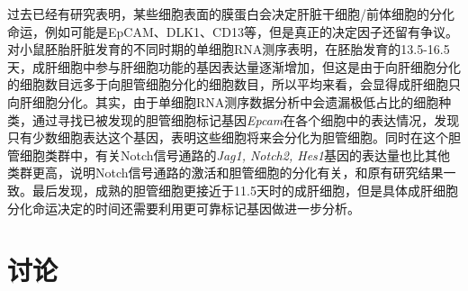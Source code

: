 \documentclass[lang=cn]{elegantpaper}
\begin{document}
过去已经有研究表明，某些细胞表面的膜蛋白会决定肝脏干细胞/前体细胞的分化命运，例如可能是EpCAM、DLK1、CD13\citep{okabe_potential_2009,tanimizu_isolation_2003,kakinuma_analyses_2009}等，但是真正的决定因子还留有争议。对小鼠胚胎肝脏发育的不同时期的单细胞RNA测序表明\citep{su_single-cell_2017}，在胚胎发育的13.5-16.5天，成肝细胞中参与肝细胞功能的基因表达量逐渐增加，但这是由于向肝细胞分化的细胞数目远多于向胆管细胞分化的细胞数目，所以平均来看，会显得成肝细胞只向肝细胞分化。其实，由于单细胞RNA测序数据分析中会遗漏极低占比的细胞种类，\cite{su_single-cell_2017}通过寻找已被发现的胆管细胞标记基因\emph{Epcam}\citep{miyajima_stem/progenitor_2014}在各个细胞中的表达情况，发现只有少数细胞表达这个基因，表明这些细胞将来会分化为胆管细胞。同时在这个胆管细胞类群中，有关Notch信号通路的\emph{Jag1, Notch2, Hes1}基因的表达量也比其他类群更高，说明Notch信号通路的激活和胆管细胞的分化有关，和原有研究结果一致\citep{zong_notch_2009}。最后\cite{su_single-cell_2017}发现，成熟的胆管细胞更接近于11.5天时的成肝细胞，但是具体成肝细胞分化命运决定的时间还需要利用更可靠标记基因做进一步分析。

\section{讨论}



\end{document}
